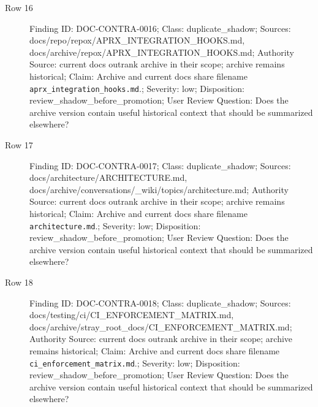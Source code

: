 \documentclass[10.5pt,a4paper,openany]{book}
\begin{document}
\begin{description}
\item[Row 16] Finding ID: DOC-\allowbreak{}CONTRA-\allowbreak{}0016; Class: duplicate\_\allowbreak{}shadow; Sources: docs/\allowbreak{}repo/\allowbreak{}repox/\allowbreak{}APRX\_\allowbreak{}INTEGRATION\_\allowbreak{}HOOKS.\allowbreak{}md, docs/\allowbreak{}archive/\allowbreak{}repox/\allowbreak{}APRX\_\allowbreak{}INTEGRATION\_\allowbreak{}HOOKS.\allowbreak{}md; Authority Source: current docs outrank archive in their scope; archive remains historical; Claim: Archive and current docs share filename \texttt{aprx\_\allowbreak{}integration\_\allowbreak{}hooks.\allowbreak{}md}.\allowbreak{}; Severity: low; Disposition: review\_\allowbreak{}shadow\_\allowbreak{}before\_\allowbreak{}promotion; User Review Question: Does the archive version contain useful historical context that should be summarized elsewhere?
\item[Row 17] Finding ID: DOC-\allowbreak{}CONTRA-\allowbreak{}0017; Class: duplicate\_\allowbreak{}shadow; Sources: docs/\allowbreak{}architecture/\allowbreak{}ARCHITECTURE.\allowbreak{}md, docs/\allowbreak{}archive/\allowbreak{}conversations/\allowbreak{}\_\allowbreak{}wiki/\allowbreak{}topics/\allowbreak{}architecture.\allowbreak{}md; Authority Source: current docs outrank archive in their scope; archive remains historical; Claim: Archive and current docs share filename \texttt{architecture.\allowbreak{}md}.\allowbreak{}; Severity: low; Disposition: review\_\allowbreak{}shadow\_\allowbreak{}before\_\allowbreak{}promotion; User Review Question: Does the archive version contain useful historical context that should be summarized elsewhere?
\item[Row 18] Finding ID: DOC-\allowbreak{}CONTRA-\allowbreak{}0018; Class: duplicate\_\allowbreak{}shadow; Sources: docs/\allowbreak{}testing/\allowbreak{}ci/\allowbreak{}CI\_\allowbreak{}ENFORCEMENT\_\allowbreak{}MATRIX.\allowbreak{}md, docs/\allowbreak{}archive/\allowbreak{}stray\_\allowbreak{}root\_\allowbreak{}docs/\allowbreak{}CI\_\allowbreak{}ENFORCEMENT\_\allowbreak{}MATRIX.\allowbreak{}md; Authority Source: current docs outrank archive in their scope; archive remains historical; Claim: Archive and current docs share filename \texttt{ci\_\allowbreak{}enforcement\_\allowbreak{}matrix.\allowbreak{}md}.\allowbreak{}; Severity: low; Disposition: review\_\allowbreak{}shadow\_\allowbreak{}before\_\allowbreak{}promotion; User Review Question: Does the archive version contain useful historical context that should be summarized elsewhere?

\end{description}
\end{document}
